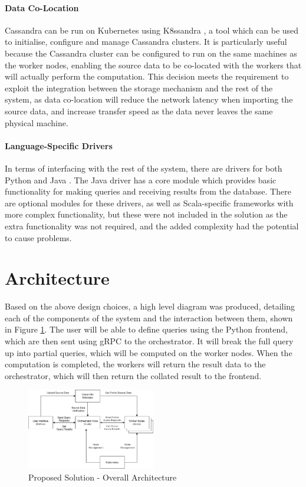 \paragraph{Data Co-Location} Cassandra can be run on Kubernetes using K8ssandra \cite{k8ssandra}, a tool which can be used to initialise, configure and manage Cassandra clusters. It is particularly useful because the Cassandra cluster can be configured to run on the same machines as the worker nodes, enabling the source data to be co-located with the workers that will actually perform the computation. This decision meets the requirement to exploit the integration between the storage mechanism and the rest of the system, as data co-location will reduce the network latency when importing the source data, and increase transfer speed as the data never leaves the same physical machine. 

\paragraph{Language-Specific Drivers} In terms of interfacing with the rest of the system, there are drivers for both Python and Java \cite{datastaxjavadriver, datastaxpythondriver}. The Java driver has a core module which provides basic functionality for making queries and receiving results from the database. There are optional modules for these drivers, as well as Scala-specific frameworks with more complex functionality, but these were not included in the solution as the extra functionality was not required, and the added complexity had the potential to cause problems. 

\section{Architecture}\label{sec:architecture}
Based on the above design choices, a high level diagram was produced, detailing each of the components of the system and the interaction between them, shown in Figure \ref{fig:overall-architecture}. The user will be able to define queries using the Python frontend, which are then sent using gRPC to the orchestrator. It will break the full query up into partial queries, which will be computed on the worker nodes. When the computation is completed, the workers will return the result data to the orchestrator, which will then return the collated result to the frontend.

\begin{figure}[h]
	\centering
	\includegraphics[width=0.5\textwidth]{chapters/diagrams/design/architecture-overall}
	\caption{Proposed Solution - Overall Architecture}
	\label{fig:overall-architecture}
\end{figure}

